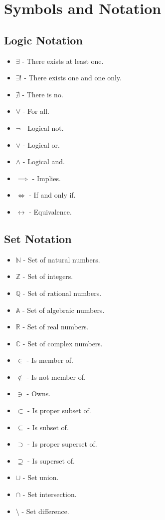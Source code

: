 \documentclass[fullpage]{article}
\newif\ifanswers
\begin{document}
\appendix
\ifanswers
\newpage
{answers}
\fi
\newpage
\section{Symbols and Notation}
\subsection*{Logic Notation}
\begin{itemize}
    \item $\exists$ - There exists at least one.
    \item $\exists!$ - There exists one and one only.
    \item $\nexists$ - There is no.
    \item $\forall$ - For all.
    \item $\neg$ - Logical not.
    \item $\lor$ - Logical or.
    \item $\land$ - Logical and.
    \item $\implies$ - Implies.
    \item $\iff$ - If and only if.
    \item $\leftrightarrow$ - Equivalence.
\end{itemize}
\subsection*{Set Notation}
\begin{itemize}
    \item $\mathbb{N}$ - Set of natural numbers.
    \item $\mathbb{Z}$ - Set of integers.
    \item $\mathbb{Q}$ - Set of rational numbers.
    \item $\mathbb{A}$ - Set of algebraic numbers.
    \item $\mathbb{R}$ - Set of real numbers.
    \item $\mathbb{C}$ - Set of complex numbers.
    \item $\in$ - Is member of.
    \item $\notin$ - Is not member of.
    \item $\ni$ - Owns.
    \item $\subset$ - Is proper subset of.
    \item $\subseteq$ - Is subset of.
    \item $\supset$ - Is proper superset of.
    \item $\supseteq$ - Is superset of.
    \item $\cup$ - Set union.
    \item $\cap$ - Set intersection.
    \item $\setminus$ - Set difference.
\end{itemize}
\end{document}

